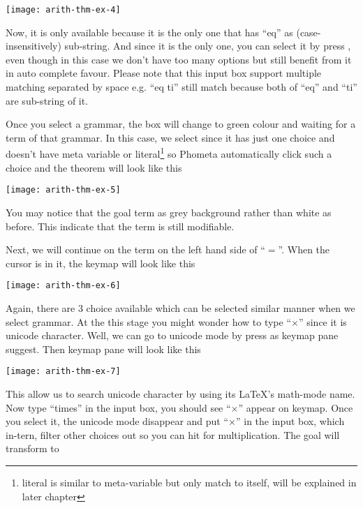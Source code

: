 \documentclass[master.tex]{subfiles}
\begin{document}
\begin{center}
\texttt{[image: arith-thm-ex-4]}
\end{center}

Now, it is only  available because it is the only one that has
``eq'' as (case-insensitively) sub-string. And since it is the only one, you can
select it by press , even though in this case we don't have too
many options but still benefit from it in auto complete favour. Please note that
this input box support multiple matching separated by space e.g. ``eq ti'' still
match  because both of ``eq'' and ``ti'' are sub-string of it.

Once you select a grammar, the box will change to green colour and waiting for a
term of that grammar. In this case, we select  since it has just
one choice and doesn't have meta variable or literal\footnote{literal is similar
  to meta-variable but only match to itself, will be explained in later
  chapter} so Phometa automatically click such a choice and the theorem will
look like this

\begin{center}
\texttt{[image: arith-thm-ex-5]}
\end{center}

You may notice that the goal term as grey background rather than white as
before. This indicate that the term is still modifiable.

Next, we will continue on the  term on the left hand side of
``$=$''. When the cursor is in it, the keymap will look like this

\begin{center}
\texttt{[image: arith-thm-ex-6]}
\end{center}

Again, there are 3 choice available which can be selected similar manner when we
select grammar. At the this stage you might wonder how to type ``$\times$''
since it is unicode character. Well, we can go to unicode mode by press
 as keymap pane suggest. Then keymap pane will look like this

\begin{center}
\texttt{[image: arith-thm-ex-7]}
\end{center}

This allow us to search unicode character by using its \LaTeX{}'s math-mode
name. Now type ``times'' in the input box, you should see ``$\times$'' appear on
keymap. Once you select it, the unicode mode disappear and put ``$\times$'' in
the input box, which in-tern, filter other choices out so you can hit
 for multiplication. The goal will transform to
\end{document}
